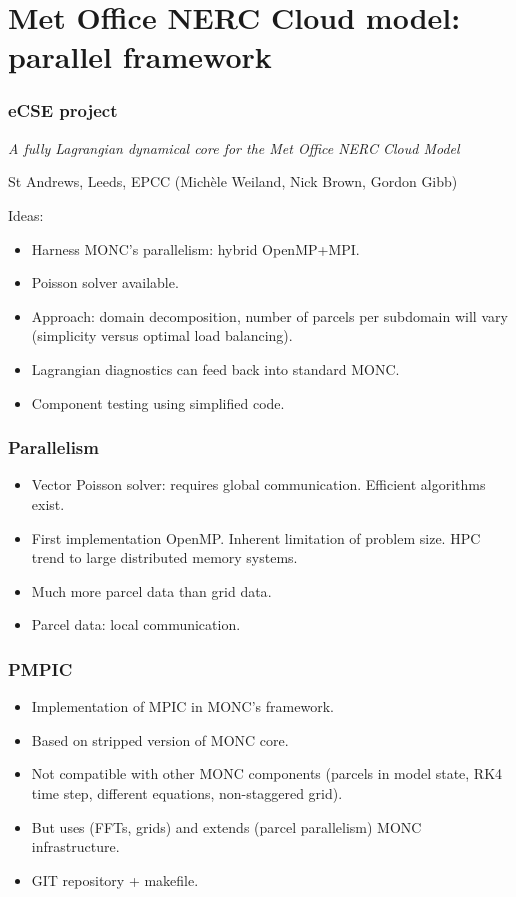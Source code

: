 \documentclass{beamer}
\def\oran#1{\color{orange} #1}
\def\gr#1{\color{dark_green} #1}
\def\re#1{\color{red}   #1}
\def\bl#1{\color{blue}  #1}
\def\pu#1{\color{purple} #1}
\begin{document}
\section{Met Office NERC Cloud model: parallel framework}

\begin{frame}
\frametitle{eCSE project}
\textit{A fully Lagrangian dynamical core for the Met Office NERC Cloud Model}
\vspace{0.2cm}
\begin{center}
St Andrews, Leeds, EPCC (Mich\`ele Weiland, Nick Brown, Gordon Gibb)
\end{center}

\vspace{0.1cm}
Ideas:
\begin{itemize}
\item Harness {\gr MONC's parallelism}: hybrid OpenMP+MPI.
\item Poisson solver available.
\item Approach: {\bl domain decomposition}, number of parcels per subdomain will vary (simplicity versus optimal load balancing).
\item {\re Lagrangian diagnostics} can feed back into standard MONC.
\item {\pu Component testing} using simplified code.
\end{itemize}

\end{frame}

\begin{frame}
\frametitle{Parallelism}

\vspace{0.2cm}
\begin{itemize}
\item Vector Poisson solver: requires global communication. {\bl Efficient algorithms} exist.
\item First implementation OpenMP. Inherent limitation of problem size. HPC trend to {\pu large distributed memory systems}. 
\item Much more {\re parcel data} than {\gr grid data}.
\item Parcel data: {\oran local communication}.
\end{itemize}

\centering

\end{frame}

\begin{frame}
\frametitle{PMPIC}
\begin{itemize}
\item Implementation of MPIC in MONC's framework.
\item Based on stripped version of MONC core.
\item Not compatible with other MONC components (parcels in model state, RK4 time step, different equations, non-staggered grid).
\item But uses (FFTs, grids) and extends (parcel parallelism) MONC infrastructure.
\item GIT repository + makefile.
\end{itemize}
\end{frame}
\end{document}
